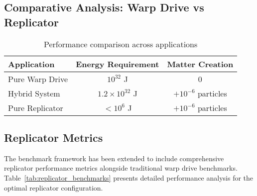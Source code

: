 \documentclass[11pt,a4paper]{article}
\begin{document}
\subsection{Comparative Analysis: Warp Drive vs Replicator}

\begin{table}[h]
\centering
\begin{tabular}{lcc}
\hline
Application & Energy Requirement & Matter Creation \\
\hline
Pure Warp Drive & $10^{32}$ J & 0 \\
Hybrid System & $1.2 \times 10^{32}$ J & $+10^{-6}$ particles \\
Pure Replicator & $< 10^{6}$ J & $+10^{-6}$ particles \\
\hline
\end{tabular}
\caption{Performance comparison across applications}
\end{table}

\subsection{Replicator Metrics}

The benchmark framework has been extended to include comprehensive replicator performance metrics alongside traditional warp drive benchmarks. Table~\ref{tab:replicator_benchmarks} presents detailed performance analysis for the optimal replicator configuration.
\end{document}

